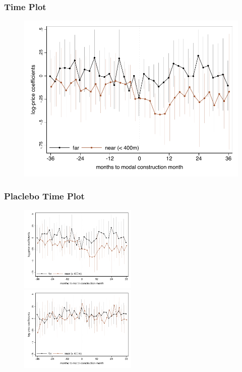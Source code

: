 \documentclass[aspectratio=149]{beamer}
\begin{document}

\begin{frame}
\frametitle{Time Plot}
\begin{center}
\begin{figure}

\includegraphics[scale=0.72]{timeplot.pdf}

\end{figure}
\end{center}
\end{frame}


\begin{frame}
\frametitle{Placlebo Time Plot}
\begin{center}
\begin{figure}

\includegraphics[width=0.5\textwidth,trim={.77cm 0cm .21cm 0cm}]{timeplot.pdf}
   \hfill
\includegraphics[width=0.5\textwidth,trim={.77cm 0cm .21cm 0cm},clip]{timeplot_placebo.pdf}

\vspace{-3mm}
\end{figure}
\end{center}
\end{frame}
\end{document}
